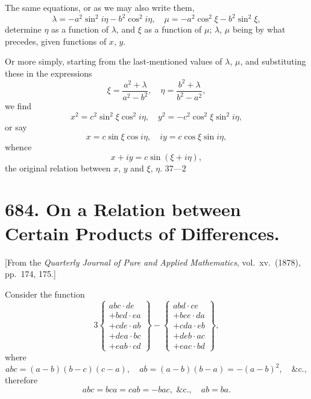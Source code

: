 \documentclass[11pt,a4paper]{book}
\begin{document}
The same equations, or as we may also write them,
\[
\lambda = -a^2 \sin^2 i\eta - b^2 \cos^2 i\eta, \quad \mu = -a^2 \cos^2 \xi - b^2 \sin^2 \xi,
\]
determine $\eta$ as a function of $\lambda$, and $\xi$ as a function of $\mu$; $\lambda$, $\mu$ being by what precedes, given functions of $x$, $y$.

Or more simply, starting from the last-mentioned values of $\lambda$, $\mu$, and substituting these in the expressions
\[
\xi = \frac{a^2 + \lambda}{a^2 - b^2}, \quad \eta = \frac{b^2 + \lambda}{b^2 - a^2},
\]
we find
\[
x^2 = c^2 \sin^2 \xi \cos^2 i\eta, \quad y^2 = -c^2 \cos^2 \xi \sin^2 i\eta,
\]
or say
\[
x = c \sin \xi \cos i\eta, \quad iy = c \cos \xi \sin i\eta,
\]
whence
\[
x + iy = c \sin(\xi + i\eta),
\]
the original relation between $x$, $y$ and $\xi$, $\eta$.
\hfill $37\text{---}2$

\newpage

\section*{684. On a Relation between Certain Products of Differences.}

[From the \textit{Quarterly Journal of Pure and Applied Mathematics}, vol.\ xv.\ (1878), pp.\ 174, 175.]

Consider the function
\[
3\left\{\begin{array}{l}
abc \cdot de \\
+ bcd \cdot ea \\
+ cde \cdot ab \\
+ dea \cdot bc \\
+ eab \cdot cd
\end{array}\right\}
-
\left\{\begin{array}{l}
abd \cdot ce \\
+ bce \cdot da \\
+ cda \cdot eb \\
+ deb \cdot ac \\
+ eac \cdot bd
\end{array}\right\},
\]
where
\[
abc = (a - b)(b - c)(c - a), \quad ab = (a - b)(b - a) = -(a - b)^2, \quad \text{\&c.},
\]
therefore
\[
abc = bca = cab = -bac, \text{ \&c.}, \quad ab = ba.
\]
\end{document}
